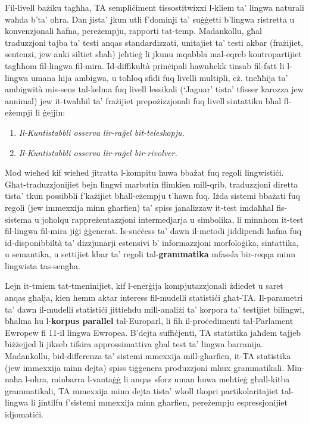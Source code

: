 \documentclass[]{../../metanetpaper}
\begin{document}
\begin{multicols}{2}
Fil-livell bażiku tagħha, TA sempliċiment tissostitwixxi l-kliem ta' lingwa naturali waħda b'ta' oħra. Dan jista’ jkun utli f'dominji ta' suġġetti b’lingwa ristretta u konvenzjonali ħafna, pereżempju, rapporti tat-temp. Madankollu, għal traduzzjoni tajba ta’ testi anqas standardizzati, unitajiet ta’ testi akbar (frażijiet, sentenzi, jew anki siltiet sħaħ) jeħtieġ li jkunu mqabbla mal-eqreb kontropartijiet tagħhom fil-lingwa fil-mira. Id-diffikultà prinċipali hawnhekk tinsab fil-fatt li l-lingwa umana hija ambigwa, u toħloq  sfidi fuq livelli multipli, eż. tneħħija ta’ ambigwità mis-sens tal-kelma fuq livell lessikali (`Jaguar' tista’ tfisser karozza jew annimal) jew it-twaħħil ta’ frażijiet prepożizzjonali fuq livell sintattiku bħal fl-eżempji li ġejjin:

\begin{enumerate}%
\item \emph{Il-Kuntistabbli osserva lir-raġel bit-teleskopju.}
\item \emph{Il-Kuntistabbli osserva lir-raġel bir-rivolver.}
\end{enumerate}

Mod wieħed kif wieħed jitratta l-kompitu huwa bbażat fuq regoli lingwistiċi. Għat-traduzzjonijiet bejn lingwi marbutin flimkien mill-qrib, traduzzjoni diretta tista’ tkun possibbli f'każijiet bħall-eżempju t’hawn fuq. Iżda sistemi bbażati fuq regoli (jew immexxija minn għarfien) ta’ spiss janalizzaw it-test imdaħħal fis-sistema u joħolqu rappreżentazzjoni intermedjarja u simbolika, li minnhom it-test fil-lingwa fil-mira jiġi ġġenerat. Is-suċċess ta’ dawn il-metodi jiddipendi ħafna fuq id-disponibbiltà ta’ dizzjunarji estensivi b’ informazzjoni morfoloġika, sintattika, u semantika, u settijiet kbar ta’ regoli tal-\textbf{grammatika} mfassla bir-reqqa minn lingwista tas-sengħa.

Lejn it-tmiem tat-tmeninijiet, kif l-enerġija kompjutazzjonali żdiedet u saret anqas għalja, kien hemm aktar interess fil-mudelli statistiċi għat-TA. Il-parametri ta’ dawn il-mudelli statistiċi jittieħdu mill-analiżi ta’ korpora ta’ testijiet bilingwi, bħalma hu l-\textbf{korpus parallel} tal-Europarl, li fih il-proċedimenti tal-Parlament Ewropew fi 11-il lingwa Ewropea. B’dejta suffiċjenti, TA statistika jaħdem tajjeb biżżejjed li jikseb tifsira approssimattiva għal test ta’ lingwa barranija. Madankollu, bid-differenza ta’ sistemi mmexxija mill-għarfien, it-TA statistika (jew immexxija minn dejta) spiss tiġġenera produzzjoni mhux grammatikali. Min-naħa l-oħra, minbarra l-vantaġġ li anqas sforz uman huwa meħtieġ għall-kitba grammatikali, TA mmexxija minn dejta tista’ wkoll tkopri partikolaritajiet tal-lingwa li jintilfu f’sistemi mmexxija minn għarfien, pereżempju espressjonijiet idjomatiċi.


\end{multicols}
\end{document}
